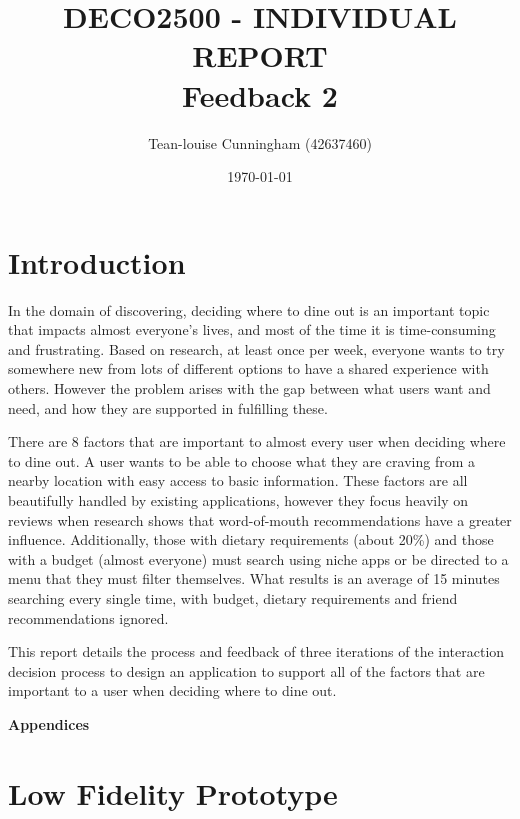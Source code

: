 \documentclass[a4 paper, 12pt]{article}
\title{DECO2500 - INDIVIDUAL REPORT \\ Feedback 2}
\author{Tean-louise Cunningham (42637460)}
\date{\today}
\begin{document}
\maketitle

\pagebreak
\tableofcontents

\pagebreak
\section{Introduction}
In the domain of discovering, deciding where to dine out is an important topic that impacts almost everyone’s lives, and most of the time it is time-consuming and frustrating. Based on research, at least once per week, everyone wants to try somewhere new from lots of different options to have a shared experience with others. However the problem arises with the gap between what users want and need, and how they are supported in fulfilling these. 

There are 8 factors that are important to almost every user when deciding where to dine out. A user wants to be able to choose what they are craving from a nearby location with easy access to basic information. These factors are all beautifully handled by existing applications, however they focus heavily on reviews when research shows that word-of-mouth recommendations have a greater influence. Additionally, those with dietary requirements (about 20\%) and those with a budget (almost everyone) must search using niche apps or be directed to a menu that they must filter themselves. What results is an average of 15 minutes searching every single time, with budget, dietary requirements and friend recommendations ignored.

This report details the process and feedback of three iterations of the interaction decision process to design an application to support all of the factors that are important to a user when deciding where to dine out. 

\pagebreak


\pagebreak




\appendix
\addappheadtotoc

\pagebreak
\begin{center}
    \Huge \textbf{Appendices}
    \section{Low Fidelity Prototype}
\end{center}
\end{document}
